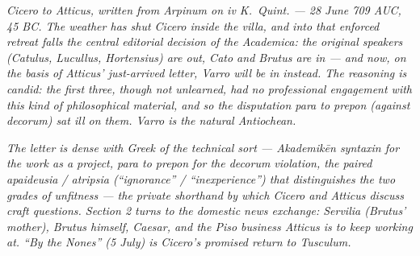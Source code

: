 
\textit{Cicero to Atticus, written from Arpinum on
\textit{iv K.\ Quint.} --- 28 June 709 AUC, 45 BC. The
weather has shut Cicero inside the villa, and into
that enforced retreat falls the central editorial
decision of the \textit{Academica}: the original
speakers (Catulus, Lucullus, Hortensius) are out,
Cato and Brutus are in --- and now, on the basis of
Atticus' just-arrived letter, Varro will be in
instead. The reasoning is candid: the first three,
though not unlearned, had no professional engagement
with this kind of philosophical material, and so the
disputation \textit{para to prepon} (against
decorum) sat ill on them. Varro is the natural
Antiochean.}

\textit{The letter is dense with Greek of the technical
sort --- \textit{Akademik\=en syntaxin} for the work
as a project, \textit{para to prepon} for the
decorum violation, the paired \textit{apaideusia} /
\textit{atripsia} (``ignorance'' / ``inexperience'')
that distinguishes the two grades of unfitness ---
the private shorthand by which Cicero and Atticus
discuss craft questions. Section 2 turns to the
domestic news exchange: Servilia (Brutus' mother),
Brutus himself, Caesar, and the Piso business
Atticus is to keep working at. ``By the Nones'' (5
July) is Cicero's promised return to Tusculum.}
